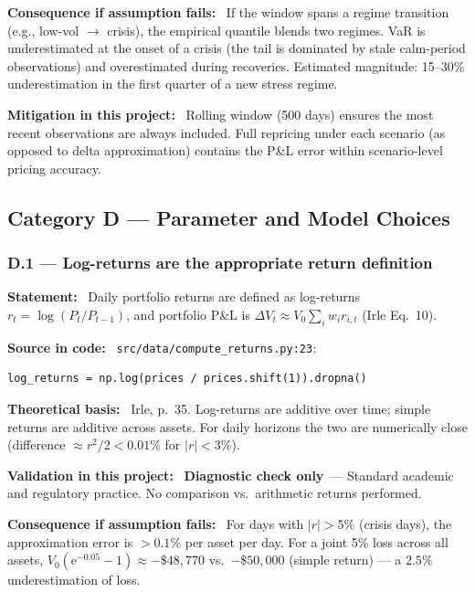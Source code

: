 \documentclass[11pt,a4paper]{article}
\newcommand{\asmfield}[1]{\medskip\noindent\textbf{#1:}\ }
\newcommand{\code}[1]{\texttt{#1}}
\newcommand{\diagnostic}{\textbf{Diagnostic check only}}
\begin{document}
\asmfield{Consequence if assumption fails}
If the window spans a regime transition (e.g., low-vol $\to$ crisis), the
empirical quantile blends two regimes. VaR is underestimated at the onset
of a crisis (the tail is dominated by stale calm-period observations)
and overestimated during recoveries. Estimated magnitude: 15--30\%
underestimation in the first quarter of a new stress regime.

\asmfield{Mitigation in this project}
Rolling window (500 days) ensures the most recent observations are always
included. Full repricing under each scenario (as opposed to delta
approximation) contains the P\&L error within scenario-level pricing
accuracy.

\subsection{Category D --- Parameter and Model Choices}\label{sec:catD}

\subsubsection{D.1 --- Log-returns are the appropriate return definition}\label{asm:D1}

\asmfield{Statement}
Daily portfolio returns are defined as log-returns $r_t = \log(P_t/P_{t-1})$,
and portfolio P\&L is $\Delta V_t \approx V_0 \sum_i w_i r_{i,t}$ (Irle
Eq.~10).

\asmfield{Source in code}
\code{src/data/compute\_returns.py:23}:
\begin{lstlisting}
log_returns = np.log(prices / prices.shift(1)).dropna()
\end{lstlisting}

\asmfield{Theoretical basis}
Irle, p.~35. Log-returns are additive over time; simple returns are additive
across assets. For daily horizons the two are numerically close (difference
$\approx r^2/2 < 0.01\%$ for $|r| < 3\%$).

\asmfield{Validation in this project}
\diagnostic\ --- Standard academic and regulatory practice. No comparison
vs.\ arithmetic returns performed.

\asmfield{Consequence if assumption fails}
For days with $|r| > 5\%$ (crisis days), the approximation error is $> 0.1\%$
per asset per day. For a joint 5\% loss across all assets,
$V_0 (\mathrm{e}^{-0.05} - 1) \approx -\$48{,}770$ vs.\ $-\$50{,}000$
(simple return) --- a $2.5\%$ underestimation of loss.
\end{document}
